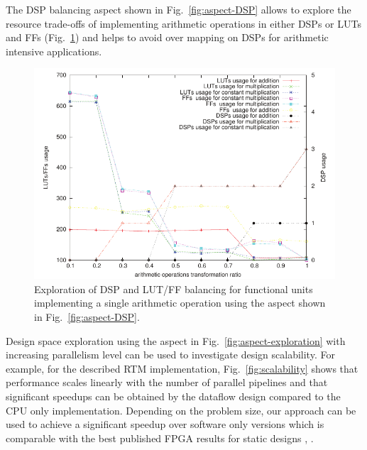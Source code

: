 The DSP balancing aspect shown in Fig.~\ref{fig:aspect-DSP} allows to
explore the resource trade-offs of implementing arithmetic operations
in either DSPs or LUTs and FFs (Fig.~\ref{fig:arith}) and helps to
avoid over mapping on DSPs for arithmetic intensive applications.

\begin{figure}[!ht]
  \centering
  \includegraphics[scale=1.2]{figs/arith}
  \caption{Exploration of DSP and LUT/FF balancing for functional units
    implementing a single arithmetic operation using the aspect shown
    in Fig.~\ref{fig:aspect-DSP}.}
  \label{fig:arith}
\end{figure}

Design space exploration using the aspect in
Fig.~\ref{fig:aspect-exploration} with increasing parallelism level
can be used to investigate design scalability. For example, for the
described RTM implementation, Fig.~\ref{fig:scalability} shows that
performance scales linearly with the number of parallel pipelines and
that significant speedups can be obtained by the \FAST{} dataflow
design compared to the CPU only implementation. Depending on the
problem size, our approach can be used to achieve a significant
speedup over software only versions which is comparable with the best
published FPGA results for static designs
\cite{Xinyu:Qiwei:Luk:Qiang:Pell:2012}, \cite{araya2011assessing}.




